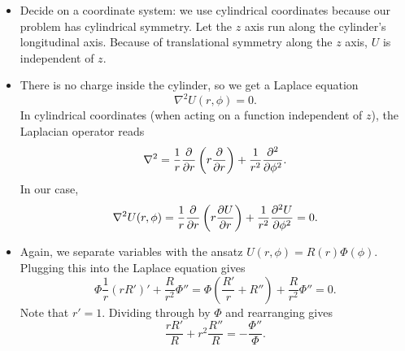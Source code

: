 \documentclass[11pt, a4paper]{article}
\renewcommand{\laplacian}{\nabla^{2}}
\begin{document}
\begin{itemize}
	\item Decide on a coordinate system: we use cylindrical coordinates because our problem has cylindrical symmetry. Let the $ z $ axis run along the cylinder's longitudinal axis. Because of translational symmetry along the $ z $ axis, $ U $ is independent of $ z $. 
	
	\item There is no charge inside the cylinder, so we get a Laplace equation
	\begin{equation*}
		\laplacian U(r, \phi) = 0.
	\end{equation*}
	In cylindrical coordinates (when acting on a function independent of $ z $), the Laplacian operator reads
	\begin{equation*}
		\laplacian = \frac{1}{r}\pdv{r}\left(r \pdv{r}\right) + \frac{1}{r^{2}} \pdv[2]{}{\phi}.
	\end{equation*}
	In our case,
	\begin{equation*}
		\laplacian U(r, \phi) = \frac{1}{r}\pdv{r}\left(r \pdv{U}{r}\right) + \frac{1}{r^{2}} \pdv[2]{U}{\phi} = 0.
	\end{equation*}
	
	\item Again, we separate variables with the ansatz $ U(r, \phi) = R(r)\Phi(\phi) $. Plugging this into the Laplace equation gives
	\begin{equation*}
		\Phi \frac{1}{r}(rR')' + \frac{R}{r^{2}}\Phi'' = \Phi \left(\frac{R'}{r} + R''\right) + \frac{R}{r^{2}}\Phi'' = 0.
	\end{equation*}
	Note that $ r'  = 1 $. Dividing through by $ \Phi $ and rearranging gives
	\begin{equation*}
		\frac{rR'}{R} + r^{2}\frac{R''}{R} = - \frac{\Phi''}{\Phi}.
	\end{equation*}
	

\end{itemize}
\end{document}
